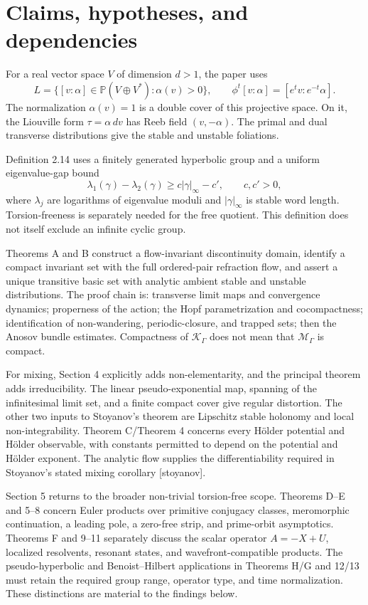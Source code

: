 \documentclass[10pt]{article}
\begin{document}
\section*{Claims, hypotheses, and dependencies}
For a real vector space \(V\) of dimension \(d>1\), the paper uses \[L=\{[v:\alpha]\in\mathbb P(V\oplus V^*):\alpha(v)>0\},\qquad
 \phi^t[v:\alpha]=[e^t v:e^{-t}\alpha].\] The normalization \(\alpha(v)=1\) is a double cover of this projective space. On it, the Liouville form \(\tau=\alpha\,dv\) has Reeb field \((v,-\alpha)\). The primal and dual transverse distributions give the stable and unstable foliations.\par
Definition 2.14 uses a finitely generated hyperbolic group and a uniform eigenvalue-gap bound \[\lambda_1(\gamma)-\lambda_2(\gamma)
 \geq c|\gamma|_\infty-c',\qquad c,c'>0,\] where \(\lambda_j\) are logarithms of eigenvalue moduli and \(|\gamma|_\infty\) is stable word length. Torsion-freeness is separately needed for the free quotient. This definition does not itself exclude an infinite cyclic group.\par
Theorems A and B construct a flow-invariant discontinuity domain, identify a compact invariant set with the full ordered-pair refraction flow, and assert a unique transitive basic set with analytic ambient stable and unstable distributions. The proof chain is: transverse limit maps and convergence dynamics; properness of the action; the Hopf parametrization and cocompactness; identification of non-wandering, periodic-closure, and trapped sets; then the Anosov bundle estimates. Compactness of \(\mathcal K_\Gamma\) does not mean that \(\mathcal M_\Gamma\) is compact.\par
For mixing, Section 4 explicitly adds non-elementarity, and the principal theorem adds irreducibility. The linear pseudo-exponential map, spanning of the infinitesimal limit set, and a finite compact cover give regular distortion. The other two inputs to Stoyanov’s theorem are Lipschitz stable holonomy and local non-integrability. Theorem C/Theorem 4 concerns every Hölder potential and Hölder observable, with constants permitted to depend on the potential and Hölder exponent. The analytic flow supplies the differentiability required in Stoyanov’s stated mixing corollary [stoyanov].\par
Section 5 returns to the broader non-trivial torsion-free scope. Theorems D–E and 5–8 concern Euler products over primitive conjugacy classes, meromorphic continuation, a leading pole, a zero-free strip, and prime-orbit asymptotics. Theorems F and 9–11 separately discuss the scalar operator \(A=-X+U\), localized resolvents, resonant states, and wavefront-compatible products. The pseudo-hyperbolic and Benoist–Hilbert applications in Theorems H/G and 12/13 must retain the required group range, operator type, and time normalization. These distinctions are material to the findings below.\par
\end{document}
